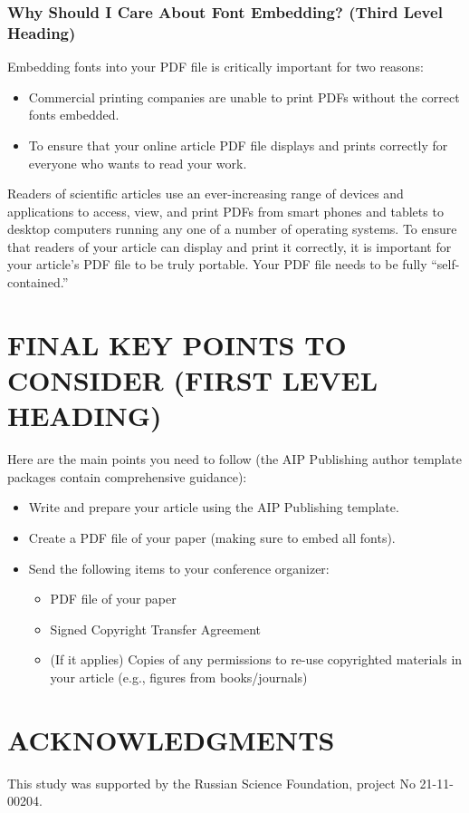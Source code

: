 \documentclass{aip-cp}
\begin{document}
\subsubsection{Why Should I Care About Font Embedding? (Third Level Heading)}
Embedding fonts into your PDF file is critically important for two reasons:
\begin{itemize}
\item Commercial printing companies are unable to print PDFs without the correct fonts embedded.
\item To ensure that your online article PDF file displays and prints correctly for everyone who wants to read your work.
\end{itemize}

Readers of scientific articles use an ever-increasing range of devices and applications to access, view, and print PDFs  from smart phones and tablets to desktop computers running any one of a number of operating systems. To ensure that readers of  your article can display and print it correctly, it is important for your article's PDF file to be truly portable. Your PDF file needs to be fully ``self-contained.''%

\section{FINAL KEY POINTS TO CONSIDER (FIRST LEVEL HEADING)}
Here are the main points you need to follow (the AIP Publishing author template packages contain comprehensive guidance):

\begin{itemize}
\item Write and prepare your article using the AIP Publishing template.
\item Create a PDF file of your paper (making sure to embed all fonts).
\item Send the following items to your conference organizer:
\begin{itemize}
\item PDF file of your paper
\item Signed Copyright Transfer Agreement
\item (If it applies) Copies of any permissions to re-use copyrighted materials in your article (e.g., figures from books/journals)
\end{itemize}
\end{itemize}




\section{ACKNOWLEDGMENTS}
This study was supported by the Russian Science Foundation, project No 21-11-00204.

\cite{Strongin2000,Kalyulin2017,Evtushenko2013,Jones2009,Zilinskas2010,Pinter1996,globalizerSystem,Barkalov2010,Strongin2020}




%
%
\end{document}
